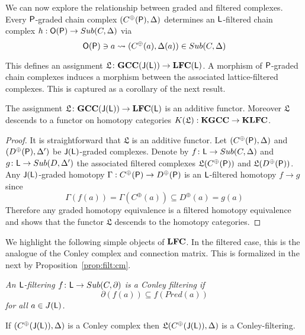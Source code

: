   
 We can now explore the relationship between graded and filtered complexes.  Every ${\mathsf P}$-graded chain complex $(C^\oplus({\mathsf P}),\Delta)$ determines an ${\mathsf L}$-filtered chain complex $h:{\mathsf O}({\mathsf P})\to Sub(C,\Delta)$ via $${\mathsf O}({\mathsf P})\ni a \rightsquigarrow (C^\oplus(a),\Delta(a))\in Sub(C,\Delta)$$


This defines an assignment $\mathfrak{L}\colon {\bf GCC}({\mathsf J}({\mathsf L}))\to {\bf LFC}({\mathsf L})$.  A morphism of ${\mathsf P}$-graded chain complexes induces a morphism between the associated lattice-filtered complexes.  This is captured as a corollary of the next result.


\begin{prop}
The assignment $\mathfrak{L}\colon {\bf GCC}({\mathsf J}({\mathsf L}))\to {\bf LFC}({\mathsf L})$ is an additive functor.  Moreover $\mathfrak{L}$ descends to a functor on homotopy categories $K(\mathfrak{L}):{\bf KGCC}\to {\bf KLFC}$.
\end{prop}
\begin{proof}
It is straightforward that $\mathfrak{L}$ is an additive functor.  Let $(C^\oplus({\mathsf P}),\Delta)$ and  $(D^\oplus({\mathsf P}),\Delta')$  be ${\mathsf J}({\mathsf L})$-graded complexes.  Denote by $f\colon {\mathsf L}\to Sub(C,\Delta)$ and $g\colon {\mathsf L}\to Sub(D,\Delta')$ the associated filtered complexes $\mathfrak{L}(C^\oplus({\mathsf P}))$ and $\mathfrak{L}(D^\oplus({\mathsf P}))$.  Any ${\mathsf J}({\mathsf L})$-graded homotopy $\Gamma:C^\oplus({\mathsf P})\to D^\oplus({\mathsf P})$ is an ${\mathsf L}$-filtered homotopy $f\to g$ since
\[
\Gamma(f(a))= \Gamma(C^\oplus(a)) \subseteq D^\oplus(a) = g(a)
\]
Therefore any graded homotopy equivalence is a filtered homotopy equivalence and  shows that the functor $\mathfrak{L}$ descends to the homotopy categories.
\end{proof}

We highlight the following simple objects of ${\bf LFC}$. In the filtered case, this is the analogue of the Conley complex and connection matrix.  This is formalized in the next by Proposition~\ref{prop:filt:cm}.



\begin{defn}
{\em 
An ${\mathsf L}$-filtering $f\colon {\mathsf L} \to Sub(C,\partial)$ is a \em{Conley filtering} if
\[
\partial(f(a)) \subseteq f(Pred(a))
\]
for all $a\in J({\mathsf L})$.
}
\end{defn}



\begin{prop}\label{prop:filt:cm}
If $(C^\oplus({\mathsf J}({\mathsf L})),\Delta)$ is a Conley complex then $\mathfrak{L}(C^\oplus({\mathsf J}({\mathsf L})),\Delta)$ is a Conley-filtering.
\end{prop}



